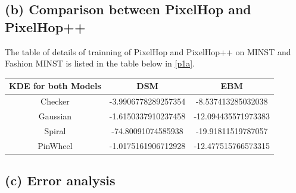 \documentclass[12pt]{article}
\begin{document}
	 \subsection*{(b) Comparison between PixelHop and PixelHop++}
	 The table of details of trainning of PixelHop and PixelHop++ on MINST and Fashion MINST is listed in the table below in \ref{p1a}.
	 \begin{table}
	 	\begin{tabular}{|c|c|c|}
	 		\hline  KDE for both Models&DSM&EBM\\
	 		\hline Checker&-3.9906778289257354&-8.537413285032038\\
	 		\hline Gaussian&-1.6150337910237458&-12.094435571973383\\
	 		\hline Spiral&-74.80091074585938&-19.91811519787057\\
	 		\hline PinWheel&-1.0175161906712928&-12.477515766573315\\
	 		\hline
	 	\end{tabular}
	 \end{table}
	 \subsection*{(c) Error analysis}
\end{document}
